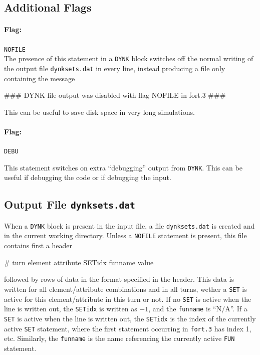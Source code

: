 \subsection{Additional Flags}

\paragraph{Flag:} \texttt{NOFILE}\\

The presence of this statement in a \texttt{DYNK} block switches off the normal writing of the output file \texttt{dynksets.dat} in every line, instead producing a file only containing the message
\begin{cverbatim}
### DYNK file output was disabled with flag NOFILE in fort.3 ### 
\end{cverbatim}
This can be useful to save disk space in very long simulations.

\paragraph{Flag:} \texttt{DEBU}

This statement switches on extra ``debugging'' output from \texttt{DYNK}.
This can be useful if debugging the code or if debugging the input.

\subsection{Output File \texttt{dynksets.dat}}

When a \texttt{DYNK} block is present in the input file, a file \texttt{dynksets.dat} is created and in the current working directory.
Unless a \texttt{NOFILE} statement is present, this file contains first a header 
\begin{cverbatim}
# turn element attribute SETidx funname value
\end{cverbatim}
followed by rows of data in the format specified in the header.
This data is written for all element/attribute combinations and in all turns, wether a \texttt{SET} is active for this element/attribute in this turn or not.
If no \texttt{SET} is active when the line is written out, the \texttt{SETidx} is written as $-1$, and the \texttt{funname} is ``N/A''.
If a \texttt{SET} is active when the line is written out, the \texttt{SETidx} is the index of the currently active \texttt{SET} statement, where the first statement occurring in \texttt{fort.3} has index 1, etc.
Similarly, the \texttt{funname} is the name referencing the currently active \texttt{FUN} statement.


